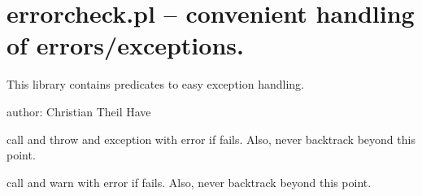 


\section{errorcheck.pl -- convenient handling of errors/exceptions.}

\label{sec:errorcheck}

This library contains predicates to easy exception handling.

author: Christian Theil Have\vspace{0.7cm}

\begin{description}
call  and throw and exception with error if  fails.
Also, never backtrack beyond this point.

call  and warn with error if  fails.
Also, never backtrack beyond this point.
\end{description}

